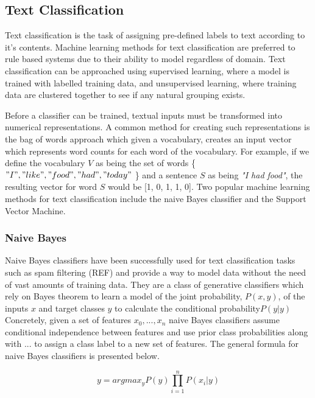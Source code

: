 \subsection{Text Classification}
Text classification is the task of assigning pre-defined labels to text according to it's contents. Machine learning methods for text classification are preferred to rule based systems due to their ability to model regardless of domain. Text classification can be approached using supervised learning, where a model is trained with labelled training data, and unsupervised learning, where training data are clustered together to see if any natural grouping exists.

\noindent
\newline
Before a classifier can be trained, textual inputs must be transformed into numerical representations. A common method for creating such representations is the bag of words approach which given a vocabulary, creates an input vector which represents word counts for each word of the vocabulary. For example, if we define the vocabulary \(V\) as being the set of words \{\("I", "like", "food", "had", "today"\) \} and a sentence \(S\) as being \textit{"I had food"}, the resulting vector for word \(S\) would be [1, 0, 1, 1, 0]. Two popular machine learning methods for text classification include the naive Bayes classifier and the Support Vector Machine.

\subsubsection{Naive Bayes}
\noindent
\newline
Naive Bayes classifiers have been successfully used for text classification tasks such as spam filtering (REF) and provide a way to model data without the need of vast amounts of training data. They are a class of generative classifiers which rely on Bayes theorem to learn a model of the joint probability, \(P(x, y)\), of the inputs \(x\) and target classes \(y\) to calculate the conditional probability\(P(y|y)\) Concretely, given a set of features \(x_{0},...,x_{n}\) naive Bayes classifiers assume conditional independence between features and use prior class probabilities along with ... to assign a class label to a new set of features. The general formula for naive Bayes classifiers is presented below.

\begin{equation}
y = argmax_{y} P(y) \prod_{i=1}^{n}P(x_{i} | y)
\end{equation}

